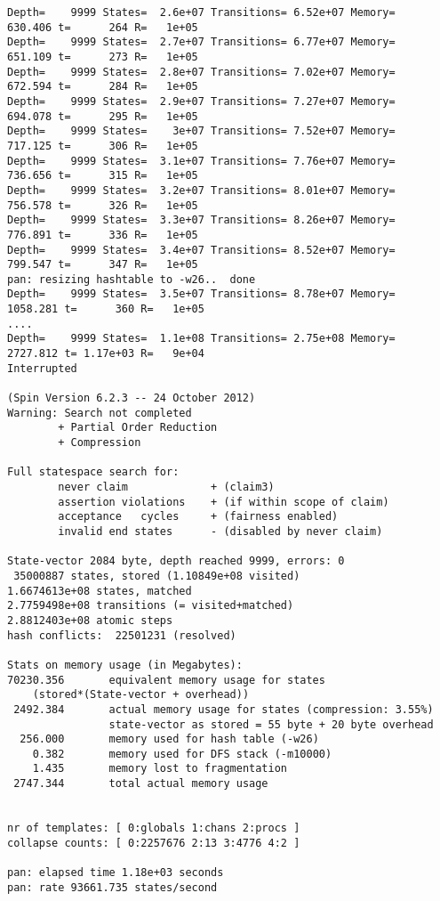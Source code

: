 \documentclass{llncs}
\begin{document}
\begin{lstlisting}[frame=single]
Depth=    9999 States=  2.6e+07 Transitions= 6.52e+07 Memory=   630.406 t=      264 R=   1e+05
Depth=    9999 States=  2.7e+07 Transitions= 6.77e+07 Memory=   651.109 t=      273 R=   1e+05
Depth=    9999 States=  2.8e+07 Transitions= 7.02e+07 Memory=   672.594 t=      284 R=   1e+05
Depth=    9999 States=  2.9e+07 Transitions= 7.27e+07 Memory=   694.078 t=      295 R=   1e+05
Depth=    9999 States=    3e+07 Transitions= 7.52e+07 Memory=   717.125 t=      306 R=   1e+05
Depth=    9999 States=  3.1e+07 Transitions= 7.76e+07 Memory=   736.656 t=      315 R=   1e+05
Depth=    9999 States=  3.2e+07 Transitions= 8.01e+07 Memory=   756.578 t=      326 R=   1e+05
Depth=    9999 States=  3.3e+07 Transitions= 8.26e+07 Memory=   776.891 t=      336 R=   1e+05
Depth=    9999 States=  3.4e+07 Transitions= 8.52e+07 Memory=   799.547 t=      347 R=   1e+05
pan: resizing hashtable to -w26..  done
Depth=    9999 States=  3.5e+07 Transitions= 8.78e+07 Memory=  1058.281 t=      360 R=   1e+05
....
Depth=    9999 States=  1.1e+08 Transitions= 2.75e+08 Memory=  2727.812 t= 1.17e+03 R=   9e+04
Interrupted

(Spin Version 6.2.3 -- 24 October 2012)
Warning: Search not completed
        + Partial Order Reduction
        + Compression

Full statespace search for:
        never claim             + (claim3)
        assertion violations    + (if within scope of claim)
        acceptance   cycles     + (fairness enabled)
        invalid end states      - (disabled by never claim)

State-vector 2084 byte, depth reached 9999, errors: 0
 35000887 states, stored (1.10849e+08 visited)
1.6674613e+08 states, matched
2.7759498e+08 transitions (= visited+matched)
2.8812403e+08 atomic steps
hash conflicts:  22501231 (resolved)

Stats on memory usage (in Megabytes):
70230.356       equivalent memory usage for states 
    (stored*(State-vector + overhead))
 2492.384       actual memory usage for states (compression: 3.55%)
                state-vector as stored = 55 byte + 20 byte overhead
  256.000       memory used for hash table (-w26)
    0.382       memory used for DFS stack (-m10000)
    1.435       memory lost to fragmentation
 2747.344       total actual memory usage


nr of templates: [ 0:globals 1:chans 2:procs ]
collapse counts: [ 0:2257676 2:13 3:4776 4:2 ]

pan: elapsed time 1.18e+03 seconds
pan: rate 93661.735 states/second
\end{lstlisting}
\end{document}
